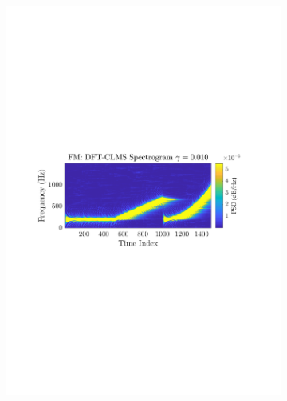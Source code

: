 \documentclass[12pt]{article}
\begin{document}
			\begin{figure}[H]
				\centering
				\begin{subfigure}{0.49\textwidth}
					\centering
					\includegraphics[trim={2.2cm 11.2cm 3.00cm  11.2cm}, clip, width=\textwidth]{../MATLAB/figures/q3_3c_fig02.pdf} 
					\captionsetup{justification=centering}
				\end{subfigure}
				\begin{subfigure}{0.49\textwidth}
					\centering

\end{subfigure}
\end{figure}
\end{document}
